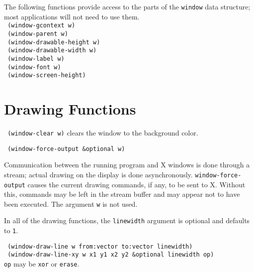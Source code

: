 The following functions provide access to the parts of the {\tt window} data
structure; most applications will not need to use them. \\

\vspace{-0.1in}
{\tt \hspace*{0.5in} (window-gcontext        w)} \\
{\tt \hspace*{0.5in} (window-parent          w)} \\
{\tt \hspace*{0.5in} (window-drawable-height w)} \\
{\tt \hspace*{0.5in} (window-drawable-width  w)} \\
{\tt \hspace*{0.5in} (window-label           w)} \\
{\tt \hspace*{0.5in} (window-font            w)} \\
{\tt \hspace*{0.5in} (window-screen-height)} \\


\section{Drawing Functions}

{\tt \hspace*{0.5in} (window-clear w)} clears the window to the background
color.

{\tt \hspace*{0.5in} (window-force-output \&optional w)}

\vspace{-0.1in}
Communication between the running program and X windows is done through a
stream; actual drawing on the display is done asynchronously.
{\tt window-force-output} causes the current drawing commands, if any,
to be sent to X.  Without this, commands may be left in the stream buffer and
may appear not to have been executed.  The argument {\tt w} is not used.

In all of the drawing functions, the {\tt linewidth} argument is optional
and defaults to {\tt 1}.

\vspace{0.1in}
{\tt \hspace*{0.5in} (window-draw-line w from:vector to:vector linewidth)} \\
{\tt \hspace*{0.5in}
 (window-draw-line-xy w x1 y1 x2 y2 \&optional linewidth op)} \\
 \hspace*{1.0in} {\tt op} may be {\tt xor} or {\tt erase}.


